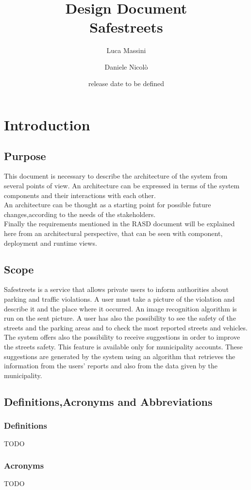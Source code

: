 \documentclass[titlepage]{article}
\author{Luca Massini \and Daniele Nicolò}
\title{Design Document
\\  Safestreets}
\date{release date to be defined}
\begin{document}
\maketitle
\newpage 
\tableofcontents
\newpage
\section{Introduction}
\subsection{Purpose}
	This document is necessary to describe the architecture of the system from several points of view. An architecture can be expressed in terms of the system components and their interactions with each other.\\
	An architecture can be thought as a starting point for possible future changes,according to the needs of the stakeholders.\\
	Finally the requirements mentioned in the RASD document will be explained here from an architectural perspective, that can be seen with component, deployment and runtime views. 
\subsection{Scope}
Safestreets is a service that allows private users to inform authorities about parking and traffic violations. A user must take a picture of the violation and describe it and the place where it occurred. An image recognition algorithm is run on the sent picture. A user has also the possibility to see the safety of the streets and the parking areas and to check the most reported streets and vehicles. \\
The system offers also the possibility to receive suggestions in order to improve the streets safety. This feature is available only for municipality accounts. These  suggestions are generated by the system using an algorithm that retrieves the information from the users' reports and also from the data given by the municipality.
\subsection{Definitions,Acronyms and Abbreviations}
\subsubsection{Definitions}
TODO
\subsubsection{Acronyms}
TODO
\end{document}
